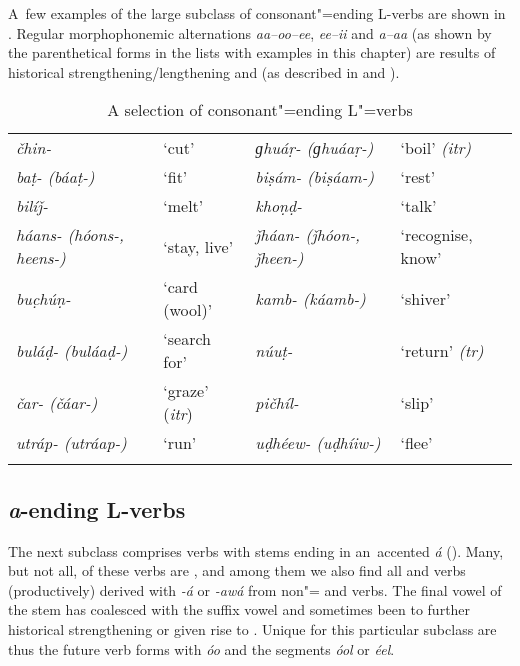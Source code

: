 A~few examples of the large subclass of consonant"=ending L-verbs are shown in . Regular morphophonemic alternations \textit{aa--oo--ee}, \textit{ee--ii} and \textit{a--aa} (as shown by the parenthetical forms in the lists with examples in this chapter) are results of historical strengthening/lengthening and  (as described in  and ). 


\begin{table}[t]
\caption{A selection of consonant"=ending L"=verbs}
\begin{tabularx}{\textwidth}{ Q l Q Q }
\lsptoprule
\textit{čhin-} &
`cut' &
\textit{ɡhuáṛ- (ɡhuáaṛ-)} &
`boil' \textit{(itr)}\\
\textit{baṭ- (báaṭ-)} &
`fit' &
\textit{biṣám- (biṣáam-)} &
`rest'\\
\textit{bilíǰ-} &
`melt' &
\textit{khoṇḍ-} &
`talk'\\
\textit{háans- (hóons-, heens-)} &
`stay, live'
&
\textit{ǰháan- (ǰhóon-, ǰheen-)} &
`recognise, know'\\
\textit{buc̣húṇ-} &
`card (wool)' &
\textit{kamb- (káamb-)} &
`shiver'\\
\textit{buláḍ- (buláaḍ-)} &
`search for' &
\textit{núuṭ-} &
`return' \textit{(tr)}\\
\textit{čar- (čáar-)} &
`graze' (\textit{itr}) &
\textit{pičhíl-} &
`slip'\\
\textit{utráp- (utráap-)} &
`run' &
\textit{uḍhéew- (uḍhíiw-)} &
`flee'\\\lspbottomrule
\end{tabularx}
\label{tab:8-lc}
\end{table}


\subsection{\textit{a}-ending L-verbs}
\label{subsec:8-3-2}
 
The next subclass comprises verbs with stems ending in an~accented \textit{á} (). Many, but not all, of these verbs are , and among them we also find all  and  verbs (productively) derived with \textit{-á} or \textit{-awá} from non"= and  verbs. The final vowel of the stem has coalesced with the suffix vowel and sometimes been  to further historical strengthening or given rise to . Unique for this particular subclass are thus the future verb forms with \textit{óo} and the  segments \textit{óol} or \textit{éel}. 


